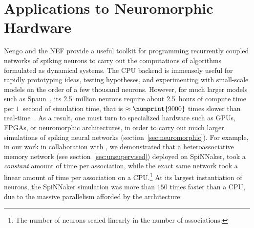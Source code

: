 \chapter{Applications to Neuromorphic Hardware}
\label{chapt:results}

Nengo and the NEF provide a useful toolkit for programming recurrently coupled networks of spiking neurons to carry out the computations of algorithms formulated as dynamical systems.
The CPU backend is immensely useful for rapidly prototyping ideas, testing hypotheses, and experimenting with small-scale models on the order of a few thousand neurons.
However, for much larger models such as Spaun~\citep{eliasmith2012}, its 2.5~million neurons require about 2.5~hours of compute time per $1$~second of simulation time, that is $\approx \numprint{9000}$ times slower than real-time~\citep{stewart2014large, mundy2016real}.
As a result, one must turn to specialized hardware such as GPUs, FPGAs, or neuromorphic architectures, in order to carry out much larger simulations of spiking neural networks (section~\ref{sec:neuromorphic}).
For example, in our work in collaboration with \citet{knight2016}, we demonstrated that a heteroassociative memory network (see section~\ref{sec:unsupervised}) deployed on SpiNNaker, took a \emph{constant} amount of time per association, while the exact same network took a linear amount of time per association on a CPU.\footnote{%
The number of neurons scaled linearly in the number of associations.}
At its largest instantiation of  neurons, the SpiNNaker simulation was more than $150$ times faster than a CPU, due to the massive parallelism afforded by the architecture.

